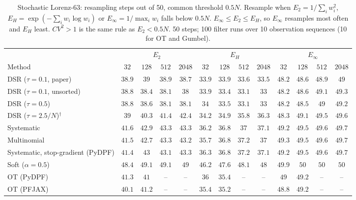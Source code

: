 \begin{table}[ht]
\centering
\small
\caption{Stochastic Lorenz-63: resampling steps out of 50, common threshold $0.5N$. Resample when $E_2=1/\sum_iw_i^2$, $E_H=\exp(-\sum_iw_i\log w_i)$ or $E_\infty=1/\max_iw_i$ falls below $0.5N$. $E_\infty\le E_2\le E_H$, so $E_\infty$ resamples most often and $E_H$ least. $CV^2>1$ is the same rule as $E_2<0.5N$. 50 steps; 100 filter runs over 10 observation sequences (10 for OT and Gumbel).}
\label{tab:trigger-fixed-lorenz63-resampling_steps}
\begin{adjustbox}{max width=\linewidth}
\begin{tabular}{lcccc|cccc|cccc}
\toprule
 & \multicolumn{4}{c}{$E_2$} & \multicolumn{4}{c}{$E_H$} & \multicolumn{4}{c}{$E_\infty$} \\
\cmidrule(lr){2-5} \cmidrule(lr){6-9} \cmidrule(lr){10-13}
Method & $32$ & $128$ & $512$ & $2048$ & $32$ & $128$ & $512$ & $2048$ & $32$ & $128$ & $512$ & $2048$ \\
\midrule
DSR ($\tau{=}0.1$, paper) & $38.9$ & $39$ & $38.9$ & $38.7$ & $33.9$ & $33.9$ & $33.6$ & $33.5$ & $48.2$ & $48.6$ & $48.9$ & $49$ \\
DSR ($\tau{=}0.1$, unsorted) & $38.8$ & $38.4$ & $38.1$ & $38$ & $33.9$ & $33.4$ & $33.1$ & $33$ & $48.2$ & $48.6$ & $49.1$ & $49.3$ \\
DSR ($\tau{=}0.5$) & $38.8$ & $38.6$ & $38.1$ & $38.1$ & $34$ & $33.5$ & $33.1$ & $33$ & $48.2$ & $48.5$ & $49$ & $49.2$ \\
DSR ($\tau{=}2.5/N$)$^\dagger$ & $39$ & $40.3$ & $41.4$ & $42.4$ & $34.2$ & $34.9$ & $35.8$ & $36.3$ & $48.3$ & $49.1$ & $49.5$ & $49.6$ \\
\midrule
Systematic & $41.6$ & $42.9$ & $43.3$ & $43.3$ & $36.2$ & $36.8$ & $37$ & $37.1$ & $49.2$ & $49.5$ & $49.6$ & $49.7$ \\
Multinomial & $41.5$ & $42.7$ & $43.3$ & $43.2$ & $35.7$ & $36.8$ & $37.2$ & $37$ & $49.3$ & $49.5$ & $49.6$ & $49.7$ \\
Systematic, stop-gradient (PyDPF) & $41.4$ & $43$ & $43.1$ & $43.3$ & $36.3$ & $36.8$ & $37.2$ & $37.1$ & $49.2$ & $49.5$ & $49.6$ & $49.7$ \\
Soft ($\alpha{=}0.5$) & $48.4$ & $49.1$ & $49.1$ & $49$ & $46.2$ & $47.6$ & $48.1$ & $48$ & $49.9$ & $50$ & $50$ & $50$ \\
OT (PyDPF) & $41.3$ & $41$ & -- & -- & $36$ & $35.4$ & -- & -- & $49$ & $49.2$ & -- & -- \\
OT (PFJAX) & $40.1$ & $41.2$ & -- & -- & $35.4$ & $35.2$ & -- & -- & $48.8$ & $49.2$ & -- & -- \\

\end{tabular}
\end{adjustbox}
\end{table}
